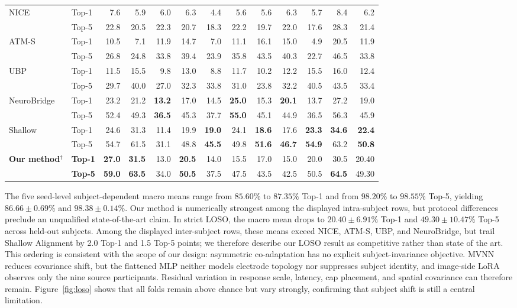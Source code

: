 \documentclass{article}
\begin{document}
\begin{table}[t]
{\begin{tabular}{llrrrrrrrrrrr}
\midrule
NICE~\citep{song2024nice} & Top-1 &7.6&5.9&6.0&6.3&4.4&5.6&5.6&6.3&5.7&8.4&6.2\\
 & Top-5 &22.8&20.5&22.3&20.7&18.3&22.2&19.7&22.0&17.6&28.3&21.4\\
ATM-S~\citep{li2024visual} & Top-1 &10.5&7.1&11.9&14.7&7.0&11.1&16.1&15.0&4.9&20.5&11.9\\
 & Top-5 &26.8&24.8&33.8&39.4&23.9&35.8&43.5&40.3&22.7&46.5&33.8\\
UBP~\citep{wu2025ubp} & Top-1 &11.5&15.5&9.8&13.0&8.8&11.7&10.2&12.2&15.5&16.0&12.4\\
 & Top-5 &29.7&40.0&27.0&32.3&33.8&31.0&23.8&32.2&40.5&43.5&33.4\\
NeuroBridge~\citep{zhang2026neurobridge} & Top-1 &23.2&21.2&\textbf{13.2}&17.0&14.5&\textbf{25.0}&15.3&\textbf{20.1}&13.7&27.2&19.0\\
 & Top-5 &52.4&49.3&\textbf{36.5}&45.3&37.7&\textbf{55.0}&45.1&44.9&36.5&56.3&45.9\\
Shallow~\citep{du2026shallow} & Top-1 &24.6&31.3&11.4&19.9&\textbf{19.0}&24.1&\textbf{18.6}&17.6&\textbf{23.3}&\textbf{34.6}&\textbf{22.4}\\
 & Top-5 &54.7&61.5&31.1&48.8&\textbf{45.5}&49.8&\textbf{51.6}&\textbf{46.7}&\textbf{54.9}&63.2&\textbf{50.8}\\
\textbf{Our method}$^{\dagger}$ & \textbf{Top-1} &\textbf{27.0}&\textbf{31.5}&13.0&\textbf{20.5}&14.0&15.5&17.0&15.0&20.0&30.5&20.40\\
 & \textbf{Top-5} &\textbf{59.0}&\textbf{63.5}&34.0&\textbf{50.5}&37.5&47.5&43.5&42.5&50.5&\textbf{64.5}&49.30\\
\bottomrule
\end{tabular}}
\end{table}

The five seed-level subject-dependent macro means range from $85.60\%$ to $87.35\%$ Top-1 and from $98.20\%$ to $98.55\%$ Top-5, yielding $86.66\pm0.69\%$ and $98.38\pm0.14\%$. Our method is numerically strongest among the displayed intra-subject rows, but protocol differences preclude an unqualified state-of-the-art claim. In strict LOSO, the macro mean drops to $20.40\pm6.91\%$ Top-1 and $49.30\pm10.47\%$ Top-5 across held-out subjects. Among the displayed inter-subject rows, these means exceed NICE, ATM-S, UBP, and NeuroBridge, but trail Shallow Alignment by 2.0 Top-1 and 1.5 Top-5 points; we therefore describe our LOSO result as competitive rather than state of the art. This ordering is consistent with the scope of our design: asymmetric co-adaptation has no explicit subject-invariance objective. MVNN reduces covariance shift, but the flattened MLP neither models electrode topology nor suppresses subject identity, and image-side LoRA observes only the nine source participants. Residual variation in response scale, latency, cap placement, and spatial covariance can therefore remain. Figure~\ref{fig:loso} shows that all folds remain above chance but vary strongly, confirming that subject shift is still a central limitation.
\end{document}
